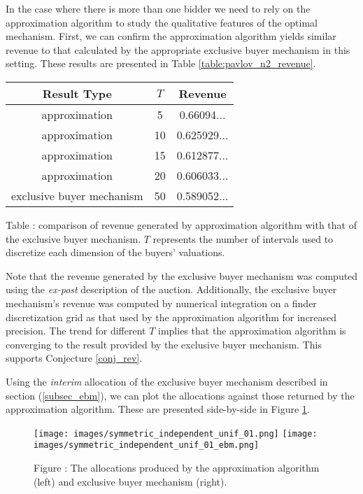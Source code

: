 In the case where there is more than one bidder we need to rely on the approximation algorithm to study the qualitative features of the optimal mechanism. First, we can confirm the approximation algorithm yields similar revenue to that calculated by the appropriate exclusive buyer mechanism in this setting. These results are presented in Table \ref{table:pavlov_n2_revenue}.

\begin{center}
    \begin{tabular}{ |c|c|c| } 
    \hline
    Result Type & $T$ & Revenue \\
    \hline
    \hline
    approximation & 5 & 0.66094... \\ 
    approximation & 10 & 0.625929... \\ 
    approximation & 15 & 0.612877... \\ 
    approximation & 20 & 0.606033... \\ 
    exclusive buyer mechanism & 50 & 0.589052... \\
    \hline
    \end{tabular}

    \vspace{1mm}
    \raggedright{\small {\sc Table \thefig\label{table:pavlov_n2_revenue}:} comparison of revenue generated by approximation algorithm with that of the exclusive buyer mechanism. $T$ represents the number of intervals used to discretize each dimension of the buyers' valuations.}
\end{center}

\noindent Note that the revenue generated by the exclusive buyer mechanism was computed using the \textit{ex-post} description of the auction. Additionally, the exclusive buyer mechanism's revenue was computed by numerical integration on a finder discretization grid as that used by the approximation algorithm for increased precision. The trend for different $T$ implies that the approximation algorithm is converging to the result provided by the exclusive buyer mechanism. This supports Conjecture \ref{conj_rev}. 

Using the \textit{interim} allocation of the exclusive buyer mechanism described in section (\ref{subsec_ebm}), we can plot the allocations against those returned by the approximation algorithm. These are presented side-by-side in Figure \ref{fig:pavlov_n2_alloc}.

\begin{figure}[H]
    \begin{center}
    \texttt{[image: images/symmetric\_independent\_unif\_01.png]}
    \texttt{[image: images/symmetric\_independent\_unif\_01\_ebm.png]}
    \end{center}
    
    \vspace{1mm}
    \raggedright{\small {\sc Figure \thefig\label{fig:pavlov_n2_alloc}:} The allocations produced by the approximation algorithm (left) and exclusive buyer mechanism (right).} 
\end{figure}


